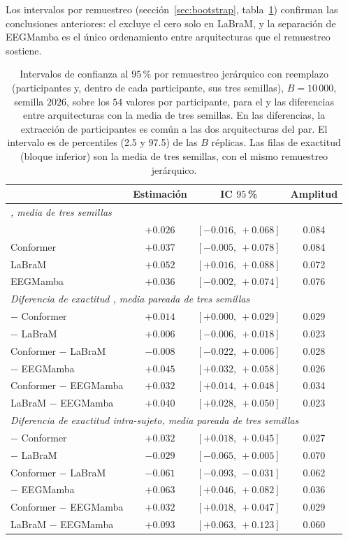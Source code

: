 Los intervalos por remuestreo (sección~\ref{sec:bootstrap}, tabla~\ref{tab:bootstrap}) confirman las
conclusiones anteriores: el \dsi{} excluye el cero solo en LaBraM, y la separación de EEGMamba es el
único ordenamiento entre arquitecturas que el remuestreo sostiene.

\begin{table}[htbp]
\centering
\caption{Intervalos de confianza al $95$\,\% por remuestreo jerárquico con reemplazo (participantes
y, dentro de cada participante, sus tres semillas), $B = 10\,000$, semilla $2026$, sobre los $54$
valores por participante, para el \dsi{} y las diferencias entre arquitecturas con la media de tres
semillas. En las diferencias, la extracción de participantes es común a las dos arquitecturas del
par. El intervalo es de percentiles (2.5 y 97.5) de las $B$ réplicas. Las filas de exactitud
(bloque inferior) son la media de tres semillas, con el mismo remuestreo jerárquico.}
\label{tab:bootstrap}
\small
\begin{tabular}{lccc}
\toprule
 & \textbf{Estimación} & \textbf{IC $95$\,\%} & \textbf{Amplitud} \\
\midrule
\multicolumn{4}{l}{\textit{\dsi{}, media de tres semillas}} \\
\eegnet{} & $+0.026$ & $[-0.016,\ +0.068]$ & 0.084 \\
Conformer & $+0.037$ & $[-0.005,\ +0.078]$ & 0.084 \\
LaBraM & $+0.052$ & $[+0.016,\ +0.088]$ & 0.072 \\
EEGMamba & $+0.036$ & $[-0.002,\ +0.074]$ & 0.076 \\
\midrule
\multicolumn{4}{l}{\textit{Diferencia de exactitud \loso{}, media pareada de tres semillas}} \\
\eegnet{} $-$ Conformer & $+0.014$ & $[+0.000,\ +0.029]$ & 0.029 \\
\eegnet{} $-$ LaBraM & $+0.006$ & $[-0.006,\ +0.018]$ & 0.023 \\
Conformer $-$ LaBraM & $-0.008$ & $[-0.022,\ +0.006]$ & 0.028 \\
\eegnet{} $-$ EEGMamba & $+0.045$ & $[+0.032,\ +0.058]$ & 0.026 \\
Conformer $-$ EEGMamba & $+0.032$ & $[+0.014,\ +0.048]$ & 0.034 \\
LaBraM $-$ EEGMamba & $+0.040$ & $[+0.028,\ +0.050]$ & 0.023 \\
\midrule
\multicolumn{4}{l}{\textit{Diferencia de exactitud intra-sujeto, media pareada de tres semillas}} \\
\eegnet{} $-$ Conformer & $+0.032$ & $[+0.018,\ +0.045]$ & 0.027 \\
\eegnet{} $-$ LaBraM & $-0.029$ & $[-0.065,\ +0.005]$ & 0.070 \\
Conformer $-$ LaBraM & $-0.061$ & $[-0.093,\ -0.031]$ & 0.062 \\
\eegnet{} $-$ EEGMamba & $+0.063$ & $[+0.046,\ +0.082]$ & 0.036 \\
Conformer $-$ EEGMamba & $+0.032$ & $[+0.018,\ +0.047]$ & 0.029 \\
LaBraM $-$ EEGMamba & $+0.093$ & $[+0.063,\ +0.123]$ & 0.060 \\
\bottomrule
\end{tabular}


\end{table}
